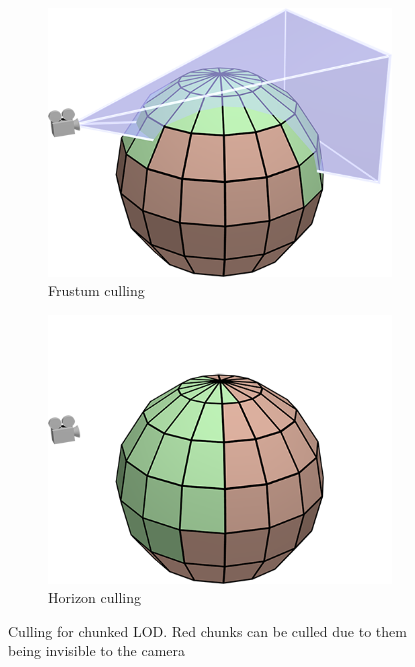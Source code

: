 \begin{figure}[htbp]
    \centering
    \begin{subfigure}[bt]{0.35\textwidth}
        \includegraphics[width=\textwidth]{figures/chunkedlod/culling_frustum.png}
        \caption{Frustum culling}
        \label{fig:culling1}
    \end{subfigure}
    \quad \quad \quad
    \begin{subfigure}[bt]{0.35\textwidth}
        \includegraphics[width=\textwidth]{figures/chunkedlod/culling_horizon.png}
        \caption{Horizon culling}
        \label{fig:culling2}
    \end{subfigure}
    \caption{Culling for chunked LOD. Red chunks can be culled due to them being invisible to the camera}
    \label{fig:cullingchunkedlod}
\end{figure}

